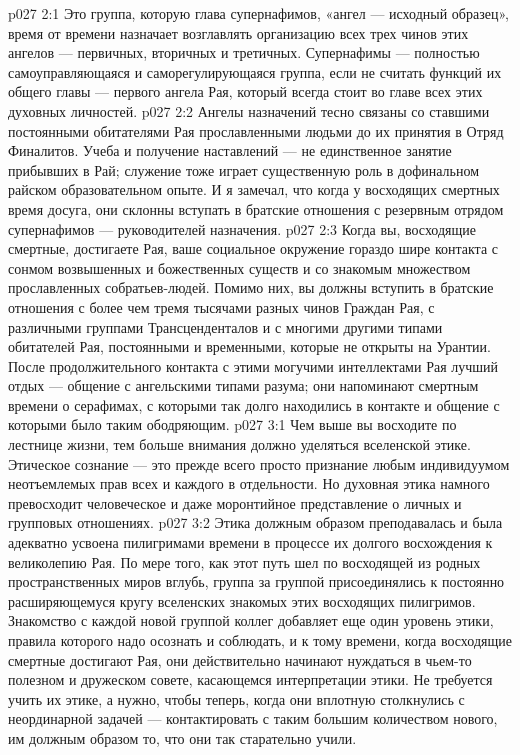 \vs p027 2:1 Это группа, которую глава супернафимов, «ангел --- исходный образец», время от времени назначает возглавлять организацию всех трех чинов этих ангелов --- первичных, вторичных и третичных. Супернафимы --- полностью самоуправляющаяся и саморегулирующаяся группа, если не считать функций их общего главы --- первого ангела Рая, который всегда стоит во главе всех этих духовных личностей.
\vs p027 2:2 Ангелы назначений тесно связаны со ставшими постоянными обитателями Рая прославленными людьми до их принятия в Отряд Финалитов. Учеба и получение наставлений --- не единственное занятие прибывших в Рай; служение тоже играет существенную роль в дофинальном райском образовательном опыте. И я замечал, что когда у восходящих смертных время досуга, они склонны вступать в братские отношения с резервным отрядом супернафимов --- руководителей назначения.
\vs p027 2:3 Когда вы, восходящие смертные, достигаете Рая, ваше социальное окружение гораздо шире контакта с сонмом возвышенных и божественных существ и со знакомым множеством прославленных собратьев\hyp{}людей. Помимо них, вы должны вступить в братские отношения с более чем тремя тысячами разных чинов Граждан Рая, с различными группами Трансценденталов и с многими другими типами обитателей Рая, постоянными и временными, которые не открыты на Урантии. После продолжительного контакта с этими могучими интеллектами Рая лучший отдых --- общение с ангельскими типами разума; они напоминают смертным времени о серафимах, с которыми так долго находились в контакте и общение с которыми было таким ободряющим.
\vs p027 3:1 Чем выше вы восходите по лестнице жизни, тем больше внимания должно уделяться вселенской этике. Этическое сознание --- это прежде всего просто признание любым индивидуумом неотъемлемых прав всех и каждого в отдельности. Но духовная этика намного превосходит человеческое и даже моронтийное представление о личных и групповых отношениях.
\vs p027 3:2 Этика должным образом преподавалась и была адекватно усвоена пилигримами времени в процессе их долгого восхождения к великолепию Рая. По мере того, как этот путь шел по восходящей из родных пространственных миров вглубь, группа за группой присоединялись к постоянно расширяющемуся кругу вселенских знакомых этих восходящих пилигримов. Знакомство с каждой новой группой коллег добавляет еще один уровень этики, правила которого надо осознать и соблюдать, и к тому времени, когда восходящие смертные достигают Рая, они действительно начинают нуждаться в чьем\hyp{}то полезном и дружеском совете, касающемся интерпретации этики. Не требуется учить их этике, а нужно, чтобы теперь, когда они вплотную столкнулись с неординарной задачей --- контактировать с таким большим количеством нового, им должным образом  то, что они так старательно учили.
